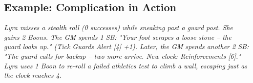 \subsection{Example: Complication in Action}
\emph{Lyra misses a stealth roll (0 successes) while sneaking past a guard post. She gains 2 Boons. The GM spends 1 SB: "Your foot scrapes a loose stone -- the guard looks up." (Tick Guards Alert [4] +1). Later, the GM spends another 2 SB: "The guard calls for backup -- two more arrive. New clock: Reinforcements [6]." Lyra uses 1 Boon to re-roll a failed athletics test to climb a wall, escaping just as the clock reaches 4.}